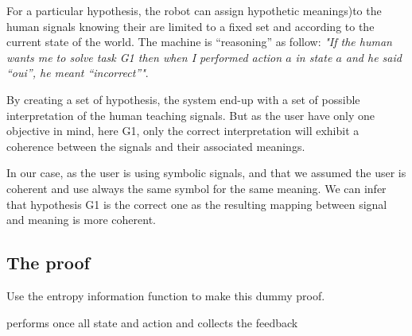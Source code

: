 For a particular hypothesis, the robot can assign hypothetic meanings)to the human signals knowing their are limited to a fixed set and according to the current state of the world. The machine is ``reasoning'' as follow: \emph{"If the human wants me to solve task G1 then when I performed action $a$ in state $a$ and he said ``oui'', he meant ``incorrect''"}. 


By creating a set of hypothesis, the system end-up with a set of possible interpretation of the human teaching signals. But as the user have only one objective in mind, here G1, only the correct interpretation will exhibit a coherence between the signals and their associated meanings. 

In our case, as the user is using symbolic signals, and that we assumed the user is coherent and use always the same symbol for the same meaning. We can infer that hypothesis G1 is the correct one as the resulting mapping between signal and meaning is more coherent.







\subsection{The proof}

Use the entropy information function to make this dummy proof.


performs once all state and action and collects the feedback



